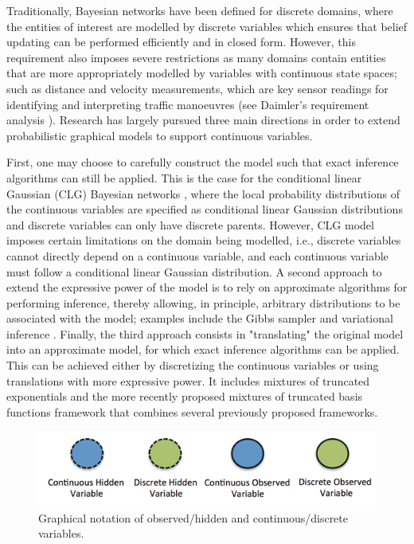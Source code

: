 Traditionally, Bayesian networks have been defined for discrete domains, where the entities of interest are modelled by discrete variables which ensures that belief updating can be performed efficiently and in closed form. However, this requirement also imposes severe restrictions as many domains contain entities that are more appropriately modelled by variables with continuous state spaces; such as distance and velocity measurements, which are key sensor readings for identifying and interpreting traffic manoeuvres (see Daimler's requirement analysis \cite{Fer14}). Research has largely pursued three main directions in order to extend probabilistic graphical models to support continuous variables. 

First, one may choose to carefully construct the model such that exact inference algorithms can still be applied. This is the case for the conditional linear Gaussian (CLG) Bayesian networks \cite{Lauritzen1992,LauritzenJensen2001}, where the local probability distributions of the continuous variables are specified as conditional linear Gaussian distributions and discrete variables can only have discrete parents. However, CLG model imposes certain limitations on the domain being modelled, i.e., discrete variables cannot directly depend on a continuous variable, and each continuous variable must follow a conditional linear Gaussian distribution. A second approach to extend the expressive power of the model is to rely on approximate algorithms for performing inference, thereby allowing, in principle, arbitrary distributions to be associated with the model; examples include the Gibbs sampler \cite{Geman1984, hrycej1990gibbs} and variational inference \cite{Jordan1999}. Finally, the third approach consists in "translating" the original model into an approximate model, for which exact inference algorithms can be applied. This can be achieved either by discretizing the continuous variables \cite{KozlovKollerUAI97} or using translations with more expressive power. It includes mixtures of truncated exponentials \cite{Moral2001} and the more recently proposed mixtures of truncated basis functions framework \cite{Langseth12} that combines several previously proposed frameworks.


\begin{figure}
\begin{center}
\includegraphics[scale=0.4]{./figures/PreliminariesNotation}
\caption{\label{Figure:PreliminariesNotation}Graphical notation of observed/hidden and continuous/discrete variables.
}
\end{center}
\end{figure}


